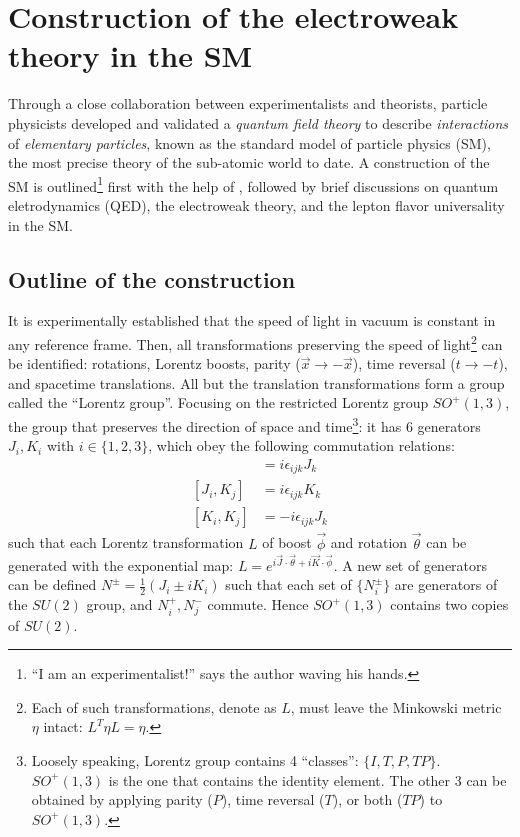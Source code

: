 \section{Construction of the electroweak theory in the SM}

Through a close collaboration between experimentalists and theorists,
particle physicists developed and validated a \emph{quantum field theory}
to describe \emph{interactions} of \emph{elementary particles},
known as the standard model of particle physics (SM),
the most precise theory of the sub-atomic world to date.
A construction of the SM is outlined\footnote{
    ``I am an experimentalist!'' says the author waving his hands.
} first with the help of
\cite{Robinson_2011,Schwichtenberg_2018},
followed by brief discussions on quantum eletrodynamics (QED),
the electroweak theory, and the lepton flavor universality in the SM.


\subsection{Outline of the construction}

It is experimentally established that the speed of light in vacuum is constant
in any reference frame.
Then, all transformations preserving the speed of light\footnote{
    Each of such transformations, denote as $L$, must leave the Minkowski metric
    $\eta$ intact: $L^T \eta L = \eta$.
} can be identified:
rotations, Lorentz boosts, parity ($\vec{x} \rightarrow -\vec{x}$),
time reversal ($t \rightarrow -t$), and spacetime translations.
All but the translation transformations form a group called the
``Lorentz group''.
Focusing on the restricted Lorentz group $SO^+(1, 3)$,
the group that preserves the direction of space and time\footnote{
    Loosely speaking, Lorentz group contains 4 ``classes'': $\{I, T, P, TP\}$.
    $SO^+(1,3)$ is the one that contains the identity element.
    The other 3 can be obtained by applying parity ($P$), time reversal ($T$),
    or both ($TP$) to $SO^+(1,3)$.
}:
it has 6 generators $J_i, K_i$ with $i \in \{1,2,3\}$,
which obey the following commutation relations:
\begin{align}
    [J_i, J_j] & = i \epsilon_{ijk} J_k \\
    [J_i, K_j] & = i \epsilon_{ijk} K_k \\
    [K_i, K_j] & = -i \epsilon_{ijk} J_k
\end{align}
such that each Lorentz transformation $L$ of boost $\vec{\phi}$ and rotation
$\vec{\theta}$ can be generated with the exponential map:
$L = e^{i \vec{J} \cdot \vec{\theta} + i \vec{K} \cdot \vec{\phi}}$.
A new set of generators can be defined
$N^\pm = \frac{1}{2}(J_i \pm i K_i)$ such that each set of $\{N^\pm_i\}$
are generators of the $SU(2)$ group, and $N^+_i, N^-_j$ commute.
Hence $SO^+(1, 3)$ contains two copies of $SU(2)$.

